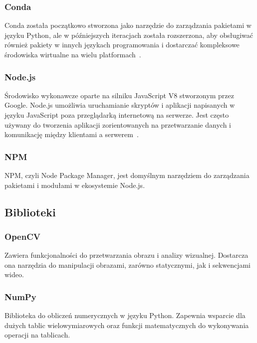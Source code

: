 \subsubsection{Conda}
\label{subsubsec:conda}

Conda została początkowo stworzona jako narzędzie do zarządzania pakietami w języku Python, ale w późniejszych iteracjach została rozszerzona, aby obsługiwać również pakiety w innych językach programowania i dostarczać kompleksowe środowiska wirtualne na wielu platformach~\cite{gruning2018}.

\subsubsection{Node.js}
\label{subsubsec:node-js}

Środowisko wykonawcze oparte na silniku JavaScript V8 stworzonym przez Google. Node.js umożliwia uruchamianie skryptów i aplikacji napisanych w języku JavaScript poza przeglądarką internetową na serwerze. Jest często używany do tworzenia aplikacji zorientowanych na przetwarzanie danych i komunikację między klientami a serwerem~\cite{tilkov2010}.

\subsubsection{NPM}
\label{subsubsec:npm}

NPM, czyli Node Package Manager, jest domyślnym narzędziem do zarządzania pakietami i modułami w ekosystemie Node.js.

\subsection{Biblioteki}
\label{subsec:libraries}

\subsubsection{OpenCV}
\label{subsubsec:opencv}

Zawiera funkcjonalności do przetwarzania obrazu i analizy wizualnej. Dostarcza ona narzędzia do manipulacji obrazami, zarówno statycznymi, jak i sekwencjami wideo.

\subsubsection{NumPy}
\label{subsubsec:numpy}

Biblioteka do obliczeń numerycznych w języku Python. Zapewnia wsparcie dla dużych tablic wielowymiarowych oraz funkcji matematycznych do wykonywania operacji na tablicach.

